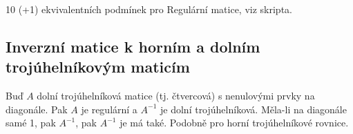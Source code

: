 \documentclass[12pt]{article}					%
\begin{document}
        \begin{veta}[V4.81 (+ T4.88)]
            10 (+1) ekvivalentních podmínek pro Regulární matice, viz skripta.
        \end{veta}

    \subsection{Inverzní matice k horním a dolním trojúhelníkovým maticím}
        \begin{tvrzeni}[T4.98]
            Buď $A$ dolní trojúhelníková matice (tj. čtvercová) s nenulovými prvky na diagonále. Pak $A$ je regulární a $A^{-1}$ je dolní trojúhelníková. Měla-li na diagonále samé 1, pak $A^{-1}$, pak $A^{-1}$ je má také. Podobně pro horní trojúhelníkové rovnice.
        \end{tvrzeni}
\end{document}
